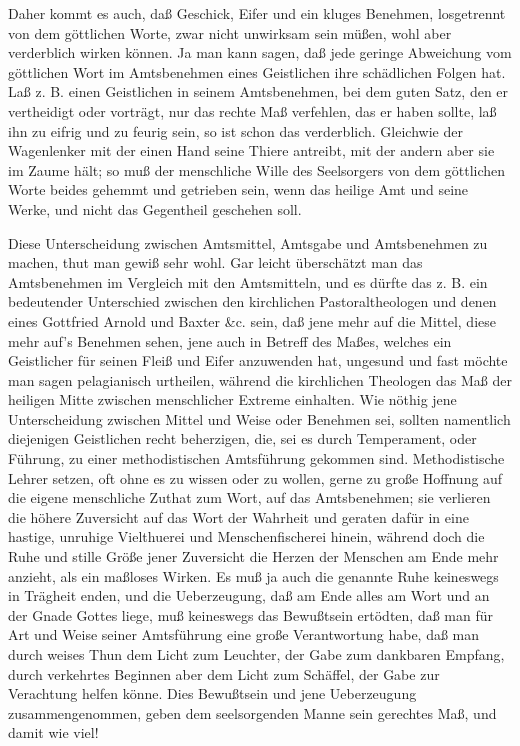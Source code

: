 Daher kommt es auch, daß Geschick, Eifer und ein kluges Benehmen, losgetrennt von dem göttlichen Worte, zwar nicht unwirksam sein müßen, wohl aber verderblich wirken können. Ja man kann sagen, daß jede geringe Abweichung vom göttlichen Wort im Amtsbenehmen eines Geistlichen ihre schädlichen Folgen hat. Laß z. B. einen Geistlichen in seinem Amtsbenehmen, bei dem guten Satz, den er vertheidigt oder vorträgt, nur das rechte Maß verfehlen, das er haben sollte, laß ihn zu eifrig und zu feurig sein, so ist schon das verderblich. Gleichwie der Wagenlenker mit der einen Hand seine Thiere antreibt, mit der andern aber sie im Zaume hält; so muß der menschliche Wille des Seelsorgers von dem göttlichen Worte beides gehemmt und getrieben sein, wenn das heilige Amt und seine Werke, und nicht das Gegentheil geschehen soll.

Diese Unterscheidung zwischen Amtsmittel, Amtsgabe und Amtsbenehmen zu machen, thut man gewiß sehr wohl. Gar leicht überschätzt man das Amtsbenehmen im Vergleich mit den Amtsmitteln, und es dürfte das z. B. ein bedeutender Unterschied zwischen den kirchlichen Pastoraltheologen und denen eines
Gottfried Arnold und Baxter \&c. sein, daß jene mehr auf die Mittel, diese mehr auf’s Benehmen sehen, jene auch in Betreff des Maßes, welches ein Geistlicher für seinen Fleiß und Eifer anzuwenden hat, ungesund und fast möchte man sagen pelagianisch urtheilen, während die kirchlichen Theologen das Maß der heiligen Mitte zwischen menschlicher Extreme einhalten. Wie nöthig jene Unterscheidung zwischen Mittel und Weise oder Benehmen sei, sollten namentlich diejenigen Geistlichen recht beherzigen, die, sei es durch Temperament, oder Führung, zu einer methodistischen Amtsführung gekommen sind. Methodistische Lehrer setzen, oft ohne es zu wissen oder zu wollen, gerne zu große Hoffnung auf die eigene menschliche Zuthat zum Wort, auf das Amtsbenehmen; sie verlieren die höhere Zuversicht auf das Wort der Wahrheit und geraten dafür in eine hastige, unruhige Vielthuerei und Menschenfischerei hinein, während doch die Ruhe und stille Größe jener Zuversicht die Herzen der Menschen am Ende mehr anzieht, als ein maßloses Wirken. Es muß ja auch die genannte Ruhe keineswegs in Trägheit enden, und die Ueberzeugung, daß am Ende alles am Wort und an der Gnade Gottes liege, muß keineswegs das Bewußtsein ertödten, daß man für Art und Weise seiner Amtsführung eine große Verantwortung habe, daß man durch weises Thun dem Licht zum Leuchter, der Gabe zum dankbaren Empfang, durch verkehrtes Beginnen aber dem Licht zum Schäffel, der Gabe zur Verachtung helfen könne. Dies Bewußtsein und jene Ueberzeugung zusammengenommen, geben dem seelsorgenden Manne sein gerechtes Maß, und damit wie viel!

